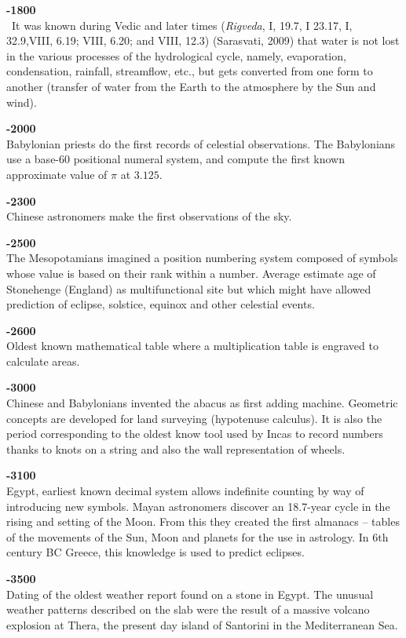 \textbf{-1800}\\\
It was known during Vedic and later times (\textit{Rigveda}, I, 19.7, I 23.17, I, 32.9,VIII, 6.19; VIII, 6.20; and VIII, 12.3) (Sarasvati, 2009) that water is not lost in the various processes of the hydrological cycle, namely, evaporation, condensation, rainfall, streamflow, etc., but gets converted from one form to another (transfer of water from the Earth to the atmosphere by the Sun and wind).

\textbf{-2000}\\
Babylonian priests do the first records of celestial observations.  The Babylonians use a base-60 positional numeral system, and compute the first known approximate value of $\pi$ at $3.125$.

\textbf{-2300}\\
Chinese astronomers make the first observations of the sky.

\textbf{-2500}\\
The Mesopotamians imagined a position numbering system composed of symbols whose value is based on their rank within a number. Average estimate age of Stonehenge (England) as multifunctional site but which might have allowed prediction of eclipse, solstice, equinox and other celestial events.

\textbf{-2600}\\
Oldest known mathematical table where a multiplication table is engraved to calculate areas.

\textbf{-3000}\\
Chinese and Babylonians invented the abacus as first adding machine. Geometric concepts are developed for land surveying (hypotenuse calculus). It is also the period corresponding to the oldest know tool used by Incas to record numbers thanks to knots on a string and also the wall representation of wheels.

\textbf{-3100}\\
Egypt, earliest known decimal system allows indefinite counting by way of introducing new symbols. Mayan astronomers discover an 18.7-year cycle in the rising and setting of the Moon. From this they created the first almanacs – tables of the movements of the Sun, Moon and planets for the use in astrology. In 6th century BC Greece, this knowledge is used to predict eclipses.

\textbf{-3500}\\
Dating of the oldest weather report found on a stone in Egypt. The unusual weather patterns described on the slab were the result of a massive volcano explosion at Thera, the present day island of Santorini in the Mediterranean Sea.

